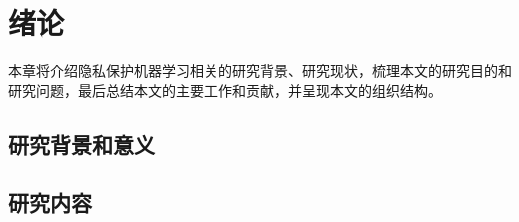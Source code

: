 \chapter{绪论}
本章将介绍隐私保护机器学习相关的研究背景、研究现状，梳理本文的研究目的和研究问题，最后总结本文的主要工作和贡献，并呈现本文的组织结构。
\section{研究背景和意义}


\section{研究内容}

